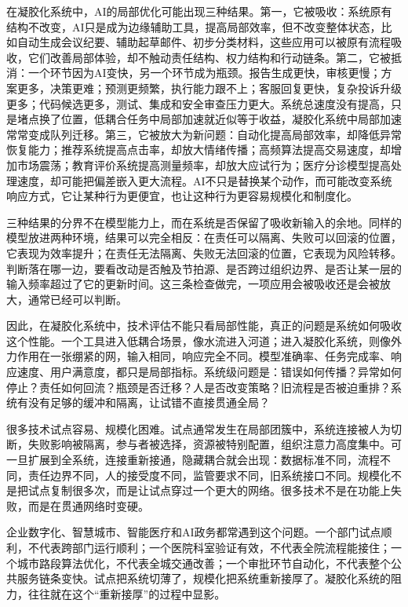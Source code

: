 在凝胶化系统中，AI的局部优化可能出现三种结果。第一，它被吸收：系统原有结构不改变，AI只是成为边缘辅助工具，提高局部效率，但不改变整体状态，比如自动生成会议纪要、辅助起草邮件、初步分类材料，这些应用可以被原有流程吸收，它们改善局部体验，却不触动责任结构、权力结构和行动链条。第二，它被抵消：一个环节因为AI变快，另一个环节成为瓶颈。报告生成更快，审核更慢；方案更多，决策更难；预测更频繁，执行能力跟不上；客服回复更快，复杂投诉升级更多；代码候选更多，测试、集成和安全审查压力更大。系统总速度没有提高，只是堵点换了位置，低耦合任务中局部加速就近似等于收益，凝胶化系统中局部加速常常变成队列迁移。第三，它被放大为新问题：自动化提高局部效率，却降低异常恢复能力；推荐系统提高点击率，却放大情绪传播；高频算法提高交易速度，却增加市场震荡；教育评价系统提高测量频率，却放大应试行为；医疗分诊模型提高处理速度，却可能把偏差嵌入更大流程。AI不只是替换某个动作，而可能改变系统响应方式，它让某种行为更便宜，也让这种行为更容易规模化和制度化。

三种结果的分界不在模型能力上，而在系统是否保留了吸收新输入的余地。同样的模型放进两种环境，结果可以完全相反：在责任可以隔离、失败可以回滚的位置，它表现为效率提升；在责任无法隔离、失败无法回滚的位置，它表现为风险转移。判断落在哪一边，要看改动是否触及节拍源、是否跨过组织边界、是否让某一层的输入频率超过了它的更新时间。这三条检查做完，一项应用会被吸收还是会被放大，通常已经可以判断。

因此，在凝胶化系统中，技术评估不能只看局部性能，真正的问题是系统如何吸收这个性能。一个工具进入低耦合场景，像水流进入河道；进入凝胶化系统，则像外力作用在一张绷紧的网，输入相同，响应完全不同。模型准确率、任务完成率、响应速度、用户满意度，都只是局部指标。系统级问题是：错误如何传播？异常如何停止？责任如何回流？瓶颈是否迁移？人是否改变策略？旧流程是否被迫重排？系统有没有足够的缓冲和隔离，让试错不直接贯通全局？


很多技术试点容易、规模化困难。试点通常发生在局部团簇中，系统连接被人为切断，失败影响被隔离，参与者被选择，资源被特别配置，组织注意力高度集中。可一旦扩展到全系统，连接重新接通，隐藏耦合就会出现：数据标准不同，流程不同，责任边界不同，人的接受度不同，监管要求不同，旧系统接口不同。规模化不是把试点复制很多次，而是让试点穿过一个更大的网络。很多技术不是在功能上失败，而是在贯通网络时变硬。

企业数字化、智慧城市、智能医疗和AI政务都常遇到这个问题。一个部门试点顺利，不代表跨部门运行顺利；一个医院科室验证有效，不代表全院流程能接住；一个城市路段算法优化，不代表全城交通改善；一个审批环节自动化，不代表整个公共服务链条变快。试点把系统切薄了，规模化把系统重新接厚了。凝胶化系统的阻力，往往就在这个“重新接厚”的过程中显影。

